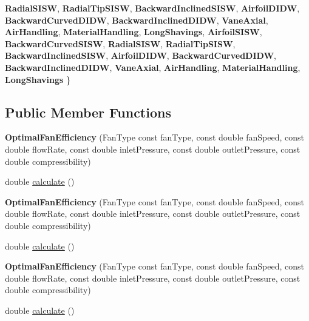 \begin{DoxyCompactItemize}
{\bfseries Radial\+S\+I\+SW}, 
{\bfseries Radial\+Tip\+S\+I\+SW}, 
\newline
{\bfseries Backward\+Inclined\+S\+I\+SW}, 
{\bfseries Airfoil\+D\+I\+DW}, 
{\bfseries Backward\+Curved\+D\+I\+DW}, 
{\bfseries Backward\+Inclined\+D\+I\+DW}, 
\newline
{\bfseries Vane\+Axial}, 
{\bfseries Air\+Handling}, 
{\bfseries Material\+Handling}, 
{\bfseries Long\+Shavings}, 
\newline
{\bfseries Airfoil\+S\+I\+SW}, 
{\bfseries Backward\+Curved\+S\+I\+SW}, 
{\bfseries Radial\+S\+I\+SW}, 
{\bfseries Radial\+Tip\+S\+I\+SW}, 
\newline
{\bfseries Backward\+Inclined\+S\+I\+SW}, 
{\bfseries Airfoil\+D\+I\+DW}, 
{\bfseries Backward\+Curved\+D\+I\+DW}, 
{\bfseries Backward\+Inclined\+D\+I\+DW}, 
\newline
{\bfseries Vane\+Axial}, 
{\bfseries Air\+Handling}, 
{\bfseries Material\+Handling}, 
{\bfseries Long\+Shavings}
 \}
\end{DoxyCompactItemize}
\subsection*{Public Member Functions}
\begin{DoxyCompactItemize}
\item 
\mbox{\label{class_optimal_fan_efficiency_aff5850e4b0f6831e6d14436c138a723d}} 
{\bfseries Optimal\+Fan\+Efficiency} (Fan\+Type const fan\+Type, const double fan\+Speed, const double flow\+Rate, const double inlet\+Pressure, const double outlet\+Pressure, const double compressibility)
\item 
double \hyperlink{class_optimal_fan_efficiency_ac35291d1095c74373393ac510e45ae02}{calculate} ()
\item 
\mbox{\label{class_optimal_fan_efficiency_aff5850e4b0f6831e6d14436c138a723d}} 
{\bfseries Optimal\+Fan\+Efficiency} (Fan\+Type const fan\+Type, const double fan\+Speed, const double flow\+Rate, const double inlet\+Pressure, const double outlet\+Pressure, const double compressibility)
\item 
double \hyperlink{class_optimal_fan_efficiency_ac35291d1095c74373393ac510e45ae02}{calculate} ()
\item 
\mbox{\label{class_optimal_fan_efficiency_aff5850e4b0f6831e6d14436c138a723d}} 
{\bfseries Optimal\+Fan\+Efficiency} (Fan\+Type const fan\+Type, const double fan\+Speed, const double flow\+Rate, const double inlet\+Pressure, const double outlet\+Pressure, const double compressibility)
\item 
double \hyperlink{class_optimal_fan_efficiency_ac35291d1095c74373393ac510e45ae02}{calculate} ()
\end{DoxyCompactItemize}


